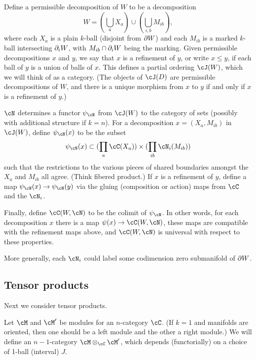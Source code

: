 Define a permissible decomposition of $W$ to be a decomposition
\[
	W = (\bigcup_a X_a) \cup (\bigcup_{i,b} M_{ib}) ,
\]
where each $X_a$ is a plain $k$-ball (disjoint from $\partial W$) and
each $M_{ib}$ is a marked $k$-ball intersecting $\partial_i W$,
with $M_{ib}\cap\partial_i W$ being the marking.
Given permissible decompositions $x$ and $y$, we say that $x$ is a refinement
of $y$, or write $x \le y$, if each ball of $y$ is a union of balls of $x$.
This defines a partial ordering $\cJ(W)$, which we will think of as a category.
(The objects of $\cJ(D)$ are permissible decompositions of $W$, and there is a unique
morphism from $x$ to $y$ if and only if $x$ is a refinement of $y$.)

$\cN$ determines 
a functor $\psi_\cN$ from $\cJ(W)$ to the category of sets 
(possibly with additional structure if $k=n$).
For a decomposition $x = (X_a, M_{ib})$ in $\cJ(W)$, define $\psi_\cN(x)$ to be the subset
\[
	\psi_\cN(x) \sub (\prod_a \cC(X_a)) \times (\prod_{ib} \cN_i(M_{ib}))
\]
such that the restrictions to the various pieces of shared boundaries amongst the
$X_a$ and $M_{ib}$ all agree.
(Think fibered product.)
If $x$ is a refinement of $y$, define a map $\psi_\cN(x)\to\psi_\cN(y)$
via the gluing (composition or action) maps from $\cC$ and the $\cN_i$.

Finally, define $\cC(W, \cN)$ to be the colimit of $\psi_\cN$.
In other words, for each decomposition $x$ there is a map
$\psi(x)\to \cC(W, \cN)$, these maps are compatible with the refinement maps
above, and $\cC(W, \cN)$ is universal with respect to these properties.

More generally, each $\cN_i$ could label some codimension zero submanifold of $\partial W$.


\subsection{Tensor products}

Next we consider tensor products.





Let $\cM$ and $\cM'$ be modules for an $n$-category $\cC$.
(If $k=1$ and manifolds are oriented, then one should be 
a left module and the other a right module.)
We will define an $n{-}1$-category $\cM\ot_\cC\cM'$, which depends (functorially)
on a choice of 1-ball (interval) $J$.

